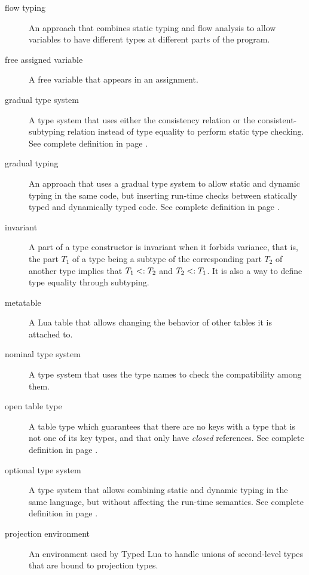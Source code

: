 \begin{description}
\item[flow typing] An approach that combines static typing and flow analysis to
allow variables to have different types at different parts of the program.

\item[free assigned variable] A free variable that appears in an assignment.

\item[gradual type system] A type system that uses either the consistency relation
or the consistent-subtyping relation instead of type equality to perform
static type checking.
See complete definition in page \pageref{sec:gradual}.

\item[gradual typing] An approach that uses a gradual type system to allow
static and dynamic typing in the same code, but inserting run-time checks
between statically typed and dynamically typed code.
See complete definition in page \pageref{sec:gradual}.

\item[invariant] A part of a type constructor is invariant when it forbids variance,
that is, the part $T_{1}$ of a type being a subtype of the corresponding part $T_{2}$ of
another type implies that $T_{1} <: T_{2}$ and $T_{2} <: T_{1}$.
It is also a way to define type equality through subtyping.

\item[metatable] A Lua table that allows changing the behavior of other tables
it is attached to.

\item[nominal type system] A type system that uses the type names to check the
compatibility among them.

\item[open table type] A table type which guarantees that there are no
keys with a type that is not one of its key types, and that only have
\emph{closed} references.
See complete definition in page \pageref{def:tabletype}.

\item[optional type system] A type system that allows combining static and
dynamic typing in the same language, but without affecting the run-time semantics.
See complete definition in page \pageref{sec:optional}.

\item[projection environment] An environment used by Typed Lua to handle unions of
second-level types that are bound to projection types.


\end{description}
